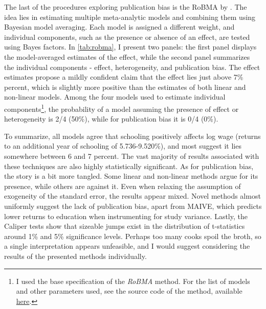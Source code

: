 The last of the procedures exploring publication bias is the \ac{RoBMA} by \cite{maier2022robust}. The idea lies in estimating multiple meta-analytic models and combining them using Bayesian model averaging. Each model is assigned a different weight, and individual components, such as the presence or absence of an effect, are tested using Bayes factors. In \autoref{tab:robma}, I present two panels: the first panel displays the model-averaged estimates of the effect, while the second panel summarizes the individual components - effect, heterogeneity, and publication bias. The effect estimates propose a mildly confident claim that the effect lies just above 7\% percent, which is slightly more positive than the estimates of both linear and non-linear models. Among the four models used to estimate individual components\footnote{I used the base specification of the \textit{RoBMA} method. For the list of models and other parameters used, see the source code of the method, available \href{https://github.com/FBartos/RoBMA/}{here}.}, the probability of a model assuming the presence of effect or heterogeneity is 2/4 (50\%), while for publication bias it is 0/4 (0\%).


To summarize, all models agree that schooling positively affects log wage (returns to an additional year of schooling of 5.736-9.520\%), and most suggest it lies somewhere between 6 and 7 percent. The vast majority of results associated with these techniques are also highly statistically significant. As for publication bias, the story is a bit more tangled. Some linear and non-linear methods argue for its presence, while others are against it. Even when relaxing the assumption of exogeneity of the standard error, the results appear mixed. Novel methods almost uniformly suggest the lack of publication bias, apart from \ac{MAIVE}, which predicts lower returns to education when instrumenting for study variance. Lastly, the Caliper tests show that sizeable jumps exist in the distribution of t-statistics around 1\% and 5\% significance levels. Perhaps too many cooks spoil the broth, so a single interpretation appears unfeasible, and I would suggest considering the results of the presented methods individually.